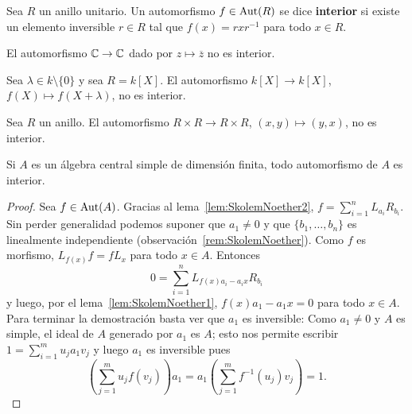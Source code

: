 \begin{definition}
	Sea $R$ un anillo unitario. Un automorfismo $f\in\operatorname{Aut}(R)$ se dice
	\textbf{interior} si existe un elemento inversible $r\in R$ tal que
	$f(x)=rxr^{-1}$ para todo $x\in R$.
\end{definition}

\begin{example}
	El automorfismo $\mathbb{C}\to\mathbb{C}$ dado por $z\mapsto\overline{z}$ no es interior.
\end{example}

\begin{example}
	Sea $\lambda\in k\setminus\{0\}$ y sea $R=k[X]$. El automorfismo $k[X]\to
	k[X]$, $f(X)\mapsto f(X+\lambda)$, no es interior.
\end{example}

\begin{example}
	Sea $R$ un anillo. El automorfismo $R\times R\to R\times R$, $(x,y)\mapsto
	(y,x)$, no es interior.
\end{example}

\begin{theorem}
	\label{thm:SkolemNoether}
	Si $A$ es un álgebra central simple de dimensión finita, todo automorfismo
	de $A$ es interior.
\end{theorem}

\begin{proof}	
	Sea $f\in\operatorname{Aut}(A)$. Gracias al lema~\ref{lem:SkolemNoether2}, 
	$f=\sum_{i=1}^n	L_{a_i}R_{b_i}$. 
	Sin perder generalidad podemos suponer que $a_1\ne 0$ y
	que $\{b_1,\dots,b_n\}$ es linealmente independiente
	(observación~\ref{rem:SkolemNoether}). Como $f$ es morfismo,
	$L_{f(x)}f=fL_x$ para todo $x\in A$. Entonces
	\[
		0=\sum_{i=1}^n L_{f(x)a_i-a_ix}R_{b_i}
	\]
	y luego, por el lema~\ref{lem:SkolemNoether1}, $f(x)a_1-a_1x=0$ para todo
	$x\in A$. Para terminar la demostración basta ver que $a_1$ es inversible:
	Como $a_1\ne 0$ y $A$ es simple, el ideal de $A$ generado por $a_1$ es $A$; esto nos permite escribir 
	$1=\sum_{i=1}^m u_ja_1v_j$ y luego $a_1$ es inversible pues 
	\[
		\left(\sum_{j=1}^m u_jf(v_j)\right)a_1=a_1\left(\sum_{j=1}^m f^{-1}(u_j)v_j\right)=1.
	\]
\end{proof}


